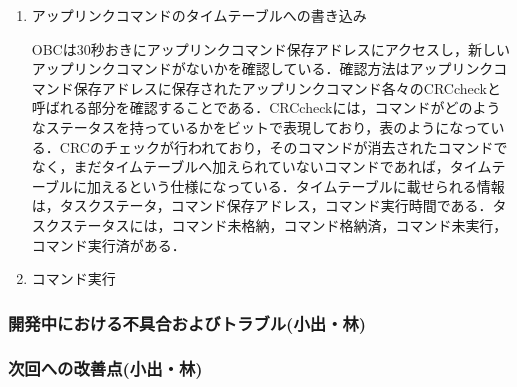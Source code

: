 \begin{enumerate}
	\item アップリンクコマンドのタイムテーブルへの書き込み\par
	OBCは30秒おきにアップリンクコマンド保存アドレスにアクセスし，新しいアップリンクコマンドがないかを確認している．確認方法はアップリンクコマンド保存アドレスに保存されたアップリンクコマンド各々のCRCcheckと呼ばれる部分を確認することである．CRCcheckには，コマンドがどのようなステータスを持っているかをビットで表現しており，表のようになっている．CRCのチェックが行われており，そのコマンドが消去されたコマンドでなく，まだタイムテーブルへ加えられていないコマンドであれば，タイムテーブルに加えるという仕様になっている．タイムテーブルに載せられる情報は，タスクステータ，コマンド保存アドレス，コマンド実行時間である．タスクステータスには，コマンド未格納，コマンド格納済，コマンド未実行，コマンド実行済がある．
	
	\par\item コマンド実行\par
	

\end{enumerate}
\subsubsection{開発中における不具合およびトラブル(小出・林)}
\subsubsection{次回への改善点(小出・林)}

